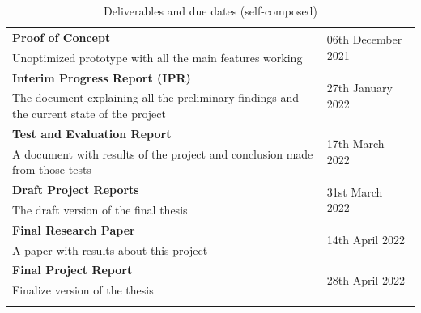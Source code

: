 \begin{longtable}{|p{115mm}|p{35mm}|}
\textbf{Proof of Concept} & \multirow{2}{*}{06th December 2021} \\
Unoptimized prototype with all the main features working &  \\ \hline
\textbf{Interim Progress Report (IPR)} & \multirow{2}{*}{27th January 2022} \\
The document explaining all the preliminary findings and the current state of the project &  \\ \hline
\textbf{Test and Evaluation Report} & \multirow{2}{*}{17th March 2022} \\
A document with results of the project and conclusion made from those tests &  \\ \hline
\textbf{Draft Project Reports} & \multirow{2}{*}{31st March 2022} \\
The draft version of the final thesis &  \\ \hline
\textbf{Final Research Paper} & \multirow{2}{*}{14th April 2022} \\
A paper with results about this project &  \\ \hline
\textbf{Final Project Report} & \multirow{2}{*}{28th April 2022} \\
Finalize version of the thesis &  \\ \hline
\caption{Deliverables and due dates (self-composed)}
\end{longtable}

